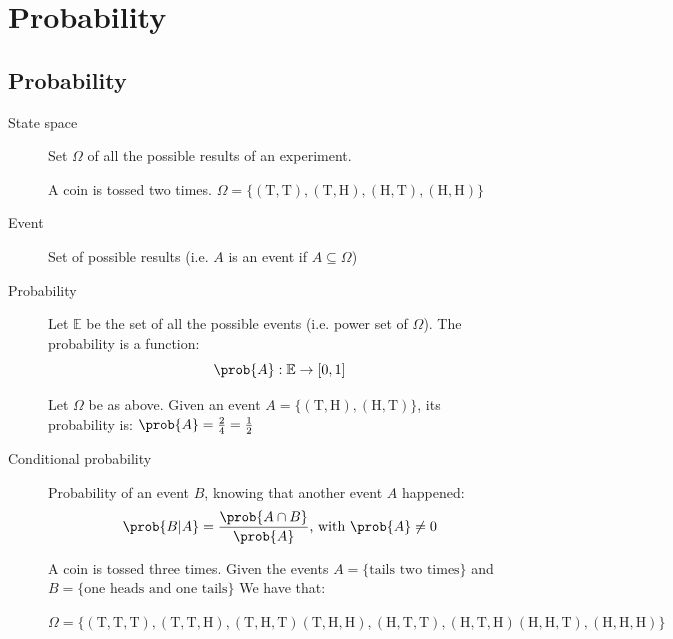 \chapter{Probability}


\section{Probability}
\begin{description}
    \item[State space] 
        Set $\Omega$ of all the possible results of an experiment.
        \begin{example}
            A coin is tossed two times. 
            $\Omega = \{ (\text{T}, \text{T}), (\text{T}, \text{H}), (\text{H}, \text{T}), (\text{H}, \text{H}) \}$
        \end{example}

    \item[Event] 
        Set of possible results (i.e. $A$ is an event if $A \subseteq \Omega$)

    \item[Probability] 
        Let $\mathbb{E}$ be the set of all the possible events (i.e. power set of $\Omega$).
        The probability is a function:
        \[ \prob{A}: \mathbb{E} \rightarrow [0, 1] \]
        \begin{example}
            Let $\Omega$ be as above.
            Given an event $A = \{ (\text{T}, \text{H}), (\text{H}, \text{T}) \}$, 
            its probability is: $\prob{A} = \frac{2}{4} = \frac{1}{2}$
        \end{example}

    \item[Conditional probability] 
        Probability of an event $B$, knowing that another event $A$ happened:
        \[ \prob{B \vert A} = \frac{\prob{A \cap B}}{\prob{A}} \text{, with } \prob{A} \neq 0 \]

        \begin{example}
            A coin is tossed three times. 
            Given the events $A = \{ \text{tails two times} \}$ and $B = \{ \text{one heads and one tails} \}$
            We have that:

            \begin{minipage}{\linewidth}
                \centering
                \small
                $\Omega = \{ 
                    (\text{T}, \text{T}, \text{T}), (\text{T}, \text{T}, \text{H}), (\text{T}, \text{H}, \text{T})
                    (\text{T}, \text{H}, \text{H}), (\text{H}, \text{T}, \text{T}), (\text{H}, \text{T}, \text{H})
                    (\text{H}, \text{H}, \text{T}), (\text{H}, \text{H}, \text{H})
                \}$
            \end{minipage}


\end{example}
\end{description}
